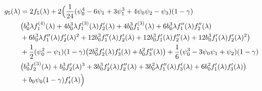 \documentclass[../main.tex]{subfiles}
\begin{document}
\begin{align}
    \begin{split}
        g_5(\lambda) &= 2 f_5(\lambda) + 2 \Bigl(\frac{1}{24} (\psi_0^4 -6 \psi_1 + 3\psi_1^3 +4\psi_0\psi_2 -\psi_3)(1-\gamma) \\
        &\bigl(b_0^3 \lambda  f_1^{(4)}(\lambda ) +4 b_0^3 \lambda  f_1^{(3)}(\lambda ) f_2'(\lambda ) + 4 b_0^3 f_1^{(3)}(\lambda )+6 b_0^3 \lambda  f_1''(\lambda ) f_2''(\lambda ) \\
        &+ 6 b_0^3 \lambda  f_1''(\lambda ) f_2'(\lambda )^2 +12 b_0^3 f_1''(\lambda ) f_2'(\lambda )+12 b_0^3 f_1'(\lambda ) f_2''(\lambda ) + 12 b_0^3 f_1'(\lambda ) f_2'(\lambda )^2\bigr) \\
        &+ \frac{1}{2} (\psi_0^2-\psi_1)(1-\gamma) \bigl(2 b_0^2 f_2'(\lambda ) f_3'(\lambda )+b_0^2 f_3''(\lambda )\bigr) + \frac{1}{6} (\psi_0^3 -3 \psi_0\psi_1+\psi_2)(1-\gamma) \\
        &\bigl(b_0^3 f_2^{(3)}(\lambda )+b_0^3 f_2'(\lambda )^3 +3 b_0^3 f_2'(\lambda ) f_2''(\lambda )+3 b_0^2 \lambda  f_1''(\lambda ) f_3'(\lambda ) +6 b_0^2 f_1'(\lambda ) f_3'(\lambda )\bigr)\\
        &+ b_0 \psi_0(1-\gamma) f_4'(\lambda ) \Bigr)
    \end{split}
\end{align}
\end{document}
